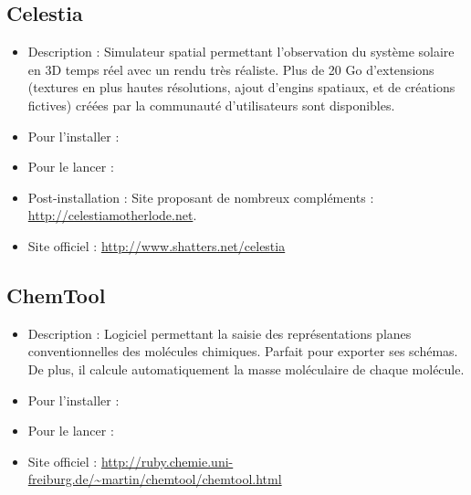 \subsection{Celestia}
\begin{itemize}
\begingroup
{}
\item Description : Simulateur spatial permettant l'observation du système solaire en 3D temps réel avec un rendu très réaliste. Plus de 20 Go d'extensions (textures en plus hautes résolutions, ajout d'engins spatiaux, et de créations fictives) créées par la communauté d'utilisateurs sont disponibles.{\par}
\endgroup
\item Pour l'installer : 
\item Pour le lancer : 
\item Post-installation : Site proposant de nombreux  compléments : \url{http://celestiamotherlode.net}.{\par}
\item Site officiel : \url{http://www.shatters.net/celestia}{\par}
\end{itemize}
\subsection{ChemTool}
\begin{itemize}
\begingroup
{}
\item Description : Logiciel permettant la saisie des représentations planes conventionnelles des molécules chimiques. Parfait pour exporter ses schémas. De plus, il calcule automatiquement la masse moléculaire de chaque molécule.{\par}
\item Pour l'installer : 
\item Pour le lancer : 
\item Site officiel : \url{http://ruby.chemie.uni-freiburg.de/~martin/chemtool/chemtool.html}{\par}
\endgroup
\end{itemize}

